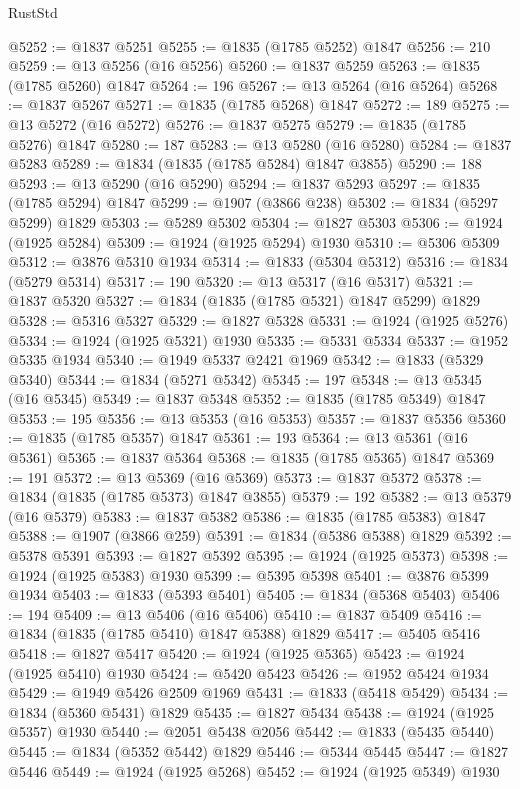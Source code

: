 \begin{lexlean}{RustStd}
\begin{coremodule}
@5252 := @1837 @5251
@5255 := @1835 (@1785 @5252) @1847
@5256 := 210
@5259 := @13 @5256 (@16 @5256)
@5260 := @1837 @5259
@5263 := @1835 (@1785 @5260) @1847
@5264 := 196
@5267 := @13 @5264 (@16 @5264)
@5268 := @1837 @5267
@5271 := @1835 (@1785 @5268) @1847
@5272 := 189
@5275 := @13 @5272 (@16 @5272)
@5276 := @1837 @5275
@5279 := @1835 (@1785 @5276) @1847
@5280 := 187
@5283 := @13 @5280 (@16 @5280)
@5284 := @1837 @5283
@5289 := @1834 (@1835 (@1785 @5284) @1847 @3855)
@5290 := 188
@5293 := @13 @5290 (@16 @5290)
@5294 := @1837 @5293
@5297 := @1835 (@1785 @5294) @1847
@5299 := @1907 (@3866 @238)
@5302 := @1834 (@5297 @5299) @1829
@5303 := @5289 @5302
@5304 := @1827 @5303
@5306 := @1924 (@1925 @5284)
@5309 := @1924 (@1925 @5294) @1930
@5310 := @5306 @5309
@5312 := @3876 @5310 @1934
@5314 := @1833 (@5304 @5312)
@5316 := @1834 (@5279 @5314)
@5317 := 190
@5320 := @13 @5317 (@16 @5317)
@5321 := @1837 @5320
@5327 := @1834 (@1835 (@1785 @5321) @1847 @5299) @1829
@5328 := @5316 @5327
@5329 := @1827 @5328
@5331 := @1924 (@1925 @5276)
@5334 := @1924 (@1925 @5321) @1930
@5335 := @5331 @5334
@5337 := @1952 @5335 @1934
@5340 := @1949 @5337 @2421 @1969
@5342 := @1833 (@5329 @5340)
@5344 := @1834 (@5271 @5342)
@5345 := 197
@5348 := @13 @5345 (@16 @5345)
@5349 := @1837 @5348
@5352 := @1835 (@1785 @5349) @1847
@5353 := 195
@5356 := @13 @5353 (@16 @5353)
@5357 := @1837 @5356
@5360 := @1835 (@1785 @5357) @1847
@5361 := 193
@5364 := @13 @5361 (@16 @5361)
@5365 := @1837 @5364
@5368 := @1835 (@1785 @5365) @1847
@5369 := 191
@5372 := @13 @5369 (@16 @5369)
@5373 := @1837 @5372
@5378 := @1834 (@1835 (@1785 @5373) @1847 @3855)
@5379 := 192
@5382 := @13 @5379 (@16 @5379)
@5383 := @1837 @5382
@5386 := @1835 (@1785 @5383) @1847
@5388 := @1907 (@3866 @259)
@5391 := @1834 (@5386 @5388) @1829
@5392 := @5378 @5391
@5393 := @1827 @5392
@5395 := @1924 (@1925 @5373)
@5398 := @1924 (@1925 @5383) @1930
@5399 := @5395 @5398
@5401 := @3876 @5399 @1934
@5403 := @1833 (@5393 @5401)
@5405 := @1834 (@5368 @5403)
@5406 := 194
@5409 := @13 @5406 (@16 @5406)
@5410 := @1837 @5409
@5416 := @1834 (@1835 (@1785 @5410) @1847 @5388) @1829
@5417 := @5405 @5416
@5418 := @1827 @5417
@5420 := @1924 (@1925 @5365)
@5423 := @1924 (@1925 @5410) @1930
@5424 := @5420 @5423
@5426 := @1952 @5424 @1934
@5429 := @1949 @5426 @2509 @1969
@5431 := @1833 (@5418 @5429)
@5434 := @1834 (@5360 @5431) @1829
@5435 := @1827 @5434
@5438 := @1924 (@1925 @5357) @1930
@5440 := @2051 @5438 @2056
@5442 := @1833 (@5435 @5440)
@5445 := @1834 (@5352 @5442) @1829
@5446 := @5344 @5445
@5447 := @1827 @5446
@5449 := @1924 (@1925 @5268)
@5452 := @1924 (@1925 @5349) @1930

\end{coremodule}
\end{lexlean}

